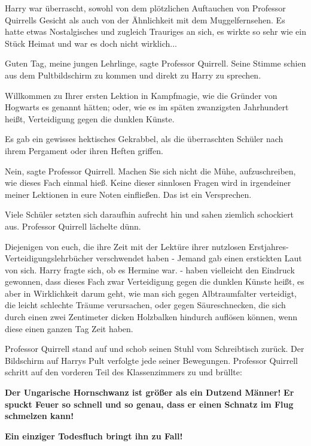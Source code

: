 Harry war überrascht, sowohl von dem plötzlichen Auftauchen von Professor
Quirrells Gesicht als auch von der Ähnlichkeit mit dem Muggelfernsehen. Es hatte
etwas Nostalgisches und zugleich Trauriges an sich, es wirkte so sehr wie ein
Stück Heimat und war es doch nicht wirklich...

\glqq Guten Tag, meine jungen Lehrlinge\grqq{}, sagte Professor Quirrell. Seine
Stimme schien aus dem Pultbildschirm zu kommen und direkt zu Harry zu sprechen.

\glqq Willkommen zu Ihrer ersten Lektion in Kampfmagie, wie die Gründer von
Hogwarts es genannt hätten; oder, wie es im späten zwanzigsten Jahrhundert
heißt, Verteidigung gegen die dunklen Künste.\grqq{}

Es gab ein gewisses hektisches Gekrabbel, als die überraschten Schüler nach
ihrem Pergament oder ihren Heften griffen.

\glqq Nein\grqq{}, sagte Professor Quirrell. \glqq Machen Sie sich nicht die
Mühe, aufzuschreiben, wie dieses Fach einmal hieß. Keine dieser sinnlosen Fragen
wird in irgendeiner meiner Lektionen in eure Noten einfließen. Das ist ein
Versprechen.\grqq{}

Viele Schüler setzten sich daraufhin aufrecht hin und sahen ziemlich schockiert
aus. Professor Quirrell lächelte dünn.

\glqq Diejenigen von euch, die ihre Zeit mit der Lektüre ihrer nutzlosen
Erstjahres-Verteidigungslehrbücher verschwendet haben -\grqq{} Jemand gab einen
erstickten Laut von sich. Harry fragte sich, ob es Hermine war. \glqq - haben
vielleicht den Eindruck gewonnen, dass dieses Fach zwar Verteidigung gegen die
dunklen Künste heißt, es aber in Wirklichkeit darum geht, wie man sich gegen
Albtraumfalter verteidigt, die leicht schlechte Träume verursachen, oder gegen
Säureschnecken, die sich durch einen zwei Zentimeter dicken Holzbalken hindurch
auflösen können, wenn diese einen ganzen Tag Zeit haben.\grqq{}

Professor Quirrell stand auf und schob seinen Stuhl vom Schreibtisch zurück. Der
Bildschirm auf Harrys Pult verfolgte jede seiner Bewegungen. Professor Quirrell
schritt auf den vorderen Teil des Klassenzimmers zu und brüllte:

\glqq \textbf{Der Ungarische Hornschwanz ist größer als ein Dutzend Männer!}
\textbf{Er spuckt Feuer so schnell und so genau, dass er einen Schnatz im Flug
schmelzen kann!}

\textbf{Ein einziger Todesfluch bringt ihn zu Fall!\grqq{}}


